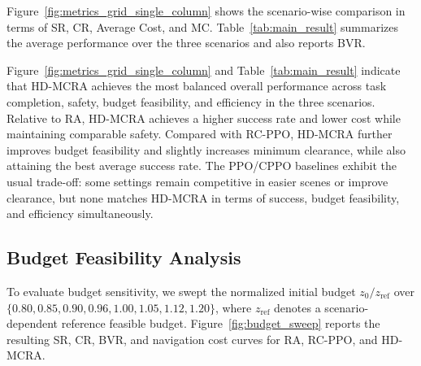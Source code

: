 \documentclass[conference]{IEEEtran}
\begin{document}
Figure~\ref{fig:metrics_grid_single_column} shows the scenario-wise comparison in terms of SR, CR, Average Cost, and MC. Table~\ref{tab:main_result} summarizes the average performance over the three scenarios and also reports BVR.



\begin{table}[t]
\caption{Average performance over the three scenarios.}
\label{tab:main_result}
\centering
{}
\end{table}

Figure~\ref{fig:metrics_grid_single_column} and Table~\ref{tab:main_result} indicate that HD-MCRA achieves the most balanced overall performance across task completion, safety, budget feasibility, and efficiency in the three scenarios. Relative to RA, HD-MCRA achieves a higher success rate and lower cost while maintaining comparable safety. Compared with RC-PPO, HD-MCRA further improves budget feasibility and slightly increases minimum clearance, while also attaining the best average success rate. The PPO/CPPO baselines exhibit the usual trade-off: some settings remain competitive in easier scenes or improve clearance, but none matches HD-MCRA in terms of success, budget feasibility, and efficiency simultaneously.

\subsection{Budget Feasibility Analysis}

To evaluate budget sensitivity, we swept the normalized initial budget $z_0/z_{\mathrm{ref}}$ over $\{0.80,0.85,0.90,0.96,1.00,1.05,1.12,1.20\}$, where $z_{\mathrm{ref}}$ denotes a scenario-dependent reference feasible budget. Figure~\ref{fig:budget_sweep} reports the resulting SR, CR, BVR, and navigation cost curves for RA, RC-PPO, and HD-MCRA.
\end{document}
